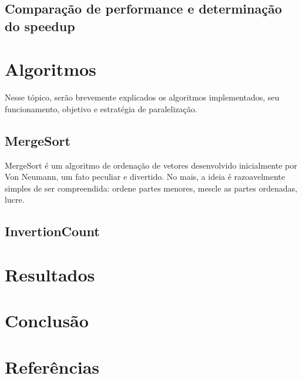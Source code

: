 \documentclass{article}
\begin{document}
\subsection{Comparação de performance e determinação do speedup}



\section{Algoritmos}\label{algoritmos}
Nesse tópico, serão brevemente explicados os algoritmos implementados, seu funcionamento, objetivo e estratégia de paralelização.

\subsection{MergeSort}
MergeSort é um algoritmo de ordenação de vetores desenvolvido inicialmente por Von Neumann, um fato peculiar e divertido. No mais, a ideia é razoavelmente simples de ser compreendida: ordene partes menores, mescle as partes ordenadas, lucre.\\

\subsection{InvertionCount}

\section{Resultados}

\section{Conclusão}

\section{Referências}
\end{document}
